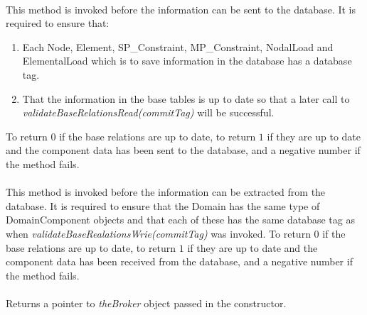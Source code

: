 \\
This method is invoked before the information can be sent to the
database. It is required to ensure that: \begin{enumerate} 
\item Each Node, Element, SP\_Constraint, MP\_Constraint, NodalLoad and
ElementalLoad which is to save information in the database has a
database tag.
\item That the information in the base tables is up to date so that a
later call to {\em validateBaseRelationsRead(commitTag)} will be successful.
\end{enumerate}
\noindent To return $0$ if the base relations are up to date, to return
$1$ if they are up to date and the component data has been sent to the
database, and a negative number if the method fails. \\

\\
This method is invoked before the information can be extracted from the
database. It is required to ensure that the Domain has the same
type of DomainComponent objects and that each of these has the same
database tag as when {\em validateBaseRealationsWrie(commitTag)} was
invoked.  To return $0$ if the base relations are up to date, to return
$1$ if they are up to date and the component data has been received from the
database, and a negative number if the method fails. \\

\\
Returns a pointer to {\em theBroker} object passed in the constructor. 